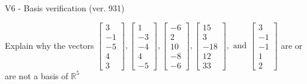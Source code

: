 \begin{exercise}
  \begin{exerciseTitle}V6 - Basis verification (ver. 931)\end{exerciseTitle}
  \begin{exerciseStatement}
    Explain why the vectors \(\left[\begin{array}{r}
3 \\
-1 \\
-5 \\
4 \\
3
\end{array}\right] , \left[\begin{array}{r}
1 \\
-3 \\
-4 \\
4 \\
-5
\end{array}\right] , \left[\begin{array}{r}
-6 \\
2 \\
10 \\
-8 \\
-6
\end{array}\right] , \left[\begin{array}{r}
15 \\
3 \\
-18 \\
12 \\
33
\end{array}\right] , \text{ and } \left[\begin{array}{r}
3 \\
-1 \\
-1 \\
1 \\
2
\end{array}\right]\) are or are not a basis of \(\mathbb{R}^5\)	



\end{exerciseStatement}
\end{exercise}
